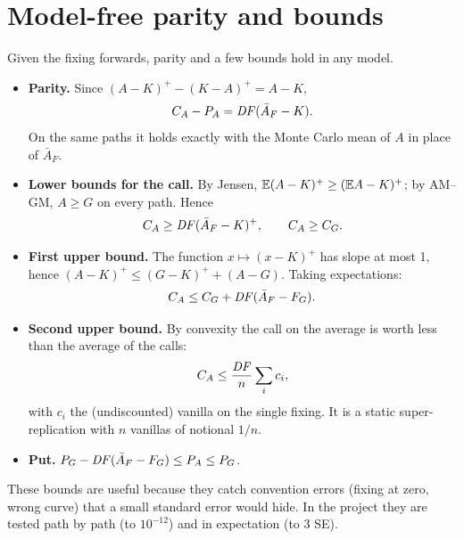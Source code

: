 \section{Model-free parity and bounds}
Given the fixing forwards, parity and a few bounds hold in any model.
\begin{itemize}
\item \textbf{Parity.} Since $(A-K)^+-(K-A)^+=A-K$,
\[
C_A-P_A=\mathit{DF}(\bar A_F-K).
\]
On the same paths it holds exactly with the Monte Carlo mean of $A$ in place of $\bar A_F$.
\item \textbf{Lower bounds for the call.} By Jensen, $\mathbb{E}(A-K)^+\ge(\mathbb{E} A-K)^+$; by AM--GM, $A\ge G$ on every path.
Hence
\[
C_A\ge\mathit{DF}(\bar A_F-K)^+,\qquad C_A\ge C_G .
\]
\item \textbf{First upper bound.} The function $x\mapsto(x-K)^+$ has slope at most 1, hence
$(A-K)^+\le(G-K)^++(A-G)$. Taking expectations:
\[
C_A\le C_G+\mathit{DF}(\bar A_F-F_G).
\]
\item \textbf{Second upper bound.} By convexity the call on the average is worth less than the average of the calls:
\[
C_A\le\frac{\mathit{DF}}{n}\sum_ic_i ,
\]
with $c_i$ the (undiscounted) vanilla on the single fixing. It is a static super-replication with $n$ vanillas of
notional $1/n$.
\item \textbf{Put.} $P_G-\mathit{DF}(\bar A_F-F_G)\le P_A\le P_G$.
\end{itemize}
These bounds are useful because they catch convention errors (fixing at zero, wrong curve) that a small standard
error would hide. In the project they are tested path by path (to $10^{-12}$) and in expectation (to 3 SE).

